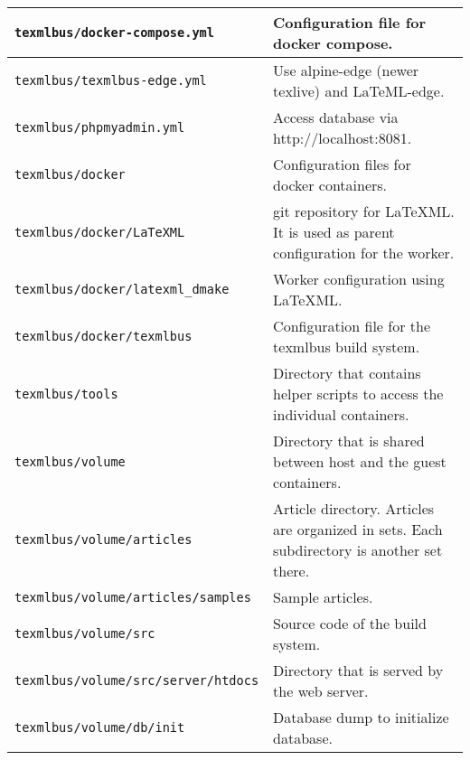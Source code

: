\documentclass[a4paper]{article}
\begin{document}
\begin{table}[h]
\begin{center}
\begin{tabular}{|p{7cm}|p{7.5cm}|}
\hline
\texttt{texmlbus/docker-compose.yml} & Configuration file for docker compose.\\
\hline
\texttt{texmlbus/texmlbus-edge.yml} & Use alpine-edge (newer texlive) and LaTeML-edge.\\
\hline
\texttt{texmlbus/phpmyadmin.yml} & Access database via http://localhost:8081.\\
\hline
\texttt{texmlbus/docker} & Configuration files for docker containers.\\
\hline
\texttt{texmlbus/docker/LaTeXML} &
	git repository for \LaTeX ML. It is used as parent configuration for the worker.\\
\hline

\texttt{texmlbus/docker/latexml\_dmake} &
	Worker configuration using \LaTeX ML.\\
\hline

\texttt{texmlbus/docker/texmlbus} &
	Configuration file for the texmlbus build system.\\
\hline

\texttt{texmlbus/tools} &
	 Directory that contains helper scripts to access the individual containers.\\
\hline

\texttt{texmlbus/volume} &
	Directory that is shared between host and the guest containers.\\
\hline

\texttt{texmlbus/volume/articles} &
	Article directory. Articles are organized in sets. Each subdirectory is another set there.\\ 
\hline

\texttt{texmlbus/volume/articles/samples} &
	Sample articles.\\
\hline

\texttt{texmlbus/volume/src} &
	Source code of the build system.\\ 
\hline

\texttt{texmlbus/volume/src/server/htdocs} &
	Directory that is served by the web server.\\
\hline
\texttt{texmlbus/volume/db/init} &
	Database dump to initialize database.\\ 
\hline
\end{tabular}
\end{center}
\end{table}
\end{document}
